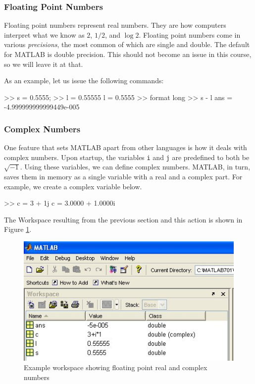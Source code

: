 \subsubsection{Floating Point Numbers}
Floating point numbers represent real numbers.  They are how computers interpret what we know as $2$, $1/2$, and $\log 2$.  Floating point numbers come in various \textit{precisions}, the most common of which are single and double.  The default for MATLAB is double precision.  This should not become an issue in this course, so we will leave it at that.
\par
As an example, let us issue the following commands:

\begin{codex}
>> s = 0.5555;
>> l = 0.55555
l =
    0.5555
>> format long
>> s - l
ans =
    -4.999999999999449e-005
\end{codex}

\subsubsection{Complex Numbers} \label{sec.matlab.numform}
One feature that sets MATLAB apart from other languages is how it deals with complex numbers.  Upon startup, the variables \verb=i= and \verb=j= are predefined to both be $\sqrt{-1}$.  Using these variables, we can define complex numbers.  MATLAB, in turn, saves them in memory as a single variable with a real and a complex part.  For example, we create a complex variable below.

\begin{codex}
>> c = 3 + 1j
c =
    3.0000 + 1.0000i
\end{codex}
The Workspace resulting from the previous section and this action is shown in Figure \nolinebreak[3] \ref{fig.numberformat}.

\begin{figure}[bht]
    \centering
    \includegraphics{NumberFormat}
    \caption{\footnotesize
            Example workspace showing floating point real and complex numbers
            \label{fig.numberformat}
            }
\end{figure}

